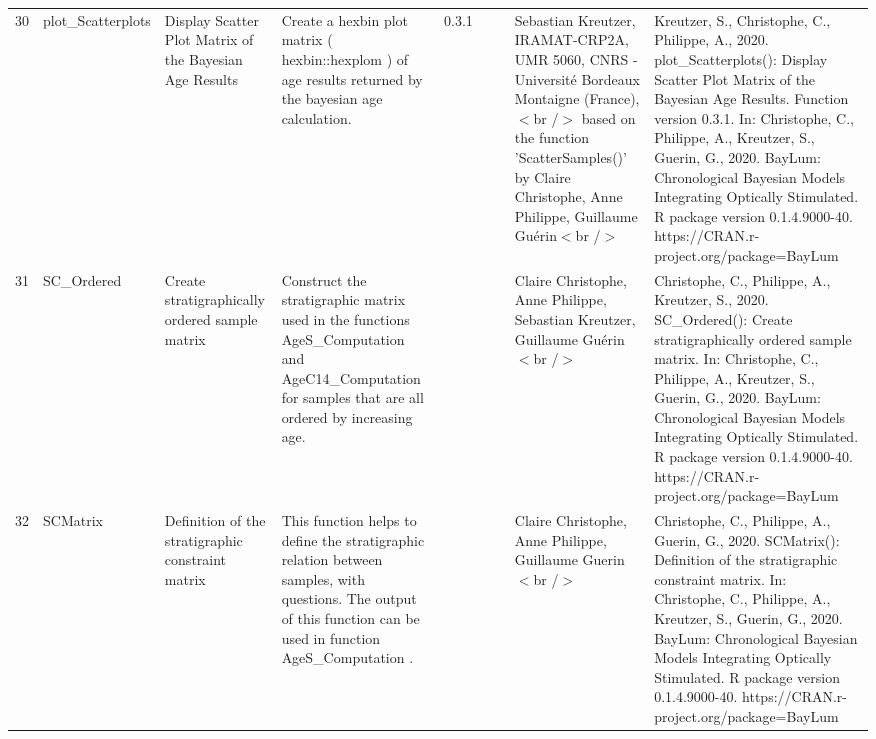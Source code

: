 \begin{table}[ht]
\begin{tabular}{rllllllll}
 \\ 
  30 & plot\_Scatterplots & Display Scatter Plot Matrix of the Bayesian Age Results & Create a hexbin plot matrix ( hexbin::hexplom ) of age results returned by the bayesian age calculation. & 0.3.1
 &  &  & Sebastian Kreutzer, IRAMAT-CRP2A, UMR 5060, CNRS - Université Bordeaux Montaigne (France),$<$br /$>$ based on the function 'ScatterSamples()' by Claire Christophe, Anne Philippe, Guillaume Guérin$<$br /$>$ & Kreutzer, S., Christophe, C., Philippe, A., 2020. plot\_Scatterplots(): Display Scatter Plot Matrix of the Bayesian Age Results. Function version 0.3.1. In: Christophe, C., Philippe, A., Kreutzer, S., Guerin, G., 2020. BayLum: Chronological Bayesian Models Integrating Optically Stimulated. R package version 0.1.4.9000-40. https://CRAN.r-project.org/package=BayLum
 \\ 
  31 & SC\_Ordered & Create stratigraphically ordered sample matrix & Construct the stratigraphic matrix used in the functions  AgeS\_Computation  and  AgeC14\_Computation  for samples that are all ordered by increasing age. &  &  &  & Claire Christophe, Anne Philippe, Sebastian Kreutzer, Guillaume Guérin$<$br /$>$ & Christophe, C., Philippe, A., Kreutzer, S., 2020. SC\_Ordered(): Create stratigraphically ordered sample matrix. In: Christophe, C., Philippe, A., Kreutzer, S., Guerin, G., 2020. BayLum: Chronological Bayesian Models Integrating Optically Stimulated. R package version 0.1.4.9000-40. https://CRAN.r-project.org/package=BayLum
 \\ 
  32 & SCMatrix & Definition of the stratigraphic constraint matrix & This function helps to define the stratigraphic relation between samples, with questions. The output of this function can be used in function  AgeS\_Computation . &  &  &  & Claire Christophe, Anne Philippe, Guillaume Guerin$<$br /$>$ & Christophe, C., Philippe, A., Guerin, G., 2020. SCMatrix(): Definition of the stratigraphic constraint matrix. In: Christophe, C., Philippe, A., Kreutzer, S., Guerin, G., 2020. BayLum: Chronological Bayesian Models Integrating Optically Stimulated. R package version 0.1.4.9000-40. https://CRAN.r-project.org/package=BayLum
 \\ 
   \hline
\end{tabular}
\end{table}

